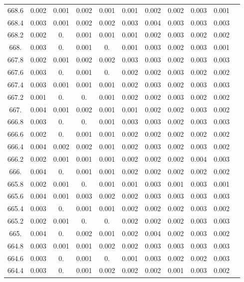 \documentclass[12pt]{ctexart}
\numberwithin{equation}{section}
\begin{document}
\begin{longtable}{ccccccccccc}
668.6	&	0.002	&	0.001	&	0.002	&	0.001	&	0.001	&	0.002	&	0.002	&	0.003	&	0.001	\\
668.4	&	0.003	&	0.001	&	0.002	&	0.002	&	0.003	&	0.004	&	0.003	&	0.003	&	0.003	\\
668.2	&	0.002	&	0.	&	0.001	&	0.001	&	0.001	&	0.002	&	0.003	&	0.002	&	0.002	\\
668.	&	0.003	&	0.	&	0.001	&	0.	&	0.001	&	0.003	&	0.002	&	0.003	&	0.001	\\
667.8	&	0.002	&	0.001	&	0.002	&	0.002	&	0.003	&	0.003	&	0.002	&	0.003	&	0.003	\\
667.6	&	0.003	&	0.	&	0.001	&	0.	&	0.002	&	0.002	&	0.003	&	0.002	&	0.002	\\
667.4	&	0.003	&	0.001	&	0.001	&	0.001	&	0.002	&	0.003	&	0.002	&	0.003	&	0.003	\\
667.2	&	0.001	&	0.	&	0.	&	0.001	&	0.002	&	0.002	&	0.003	&	0.002	&	0.002	\\
667.	&	0.004	&	0.001	&	0.002	&	0.001	&	0.001	&	0.002	&	0.002	&	0.003	&	0.002	\\
666.8	&	0.003	&	0.	&	0.	&	0.001	&	0.003	&	0.003	&	0.002	&	0.003	&	0.003	\\
666.6	&	0.002	&	0.	&	0.001	&	0.001	&	0.002	&	0.002	&	0.002	&	0.002	&	0.002	\\
666.4	&	0.004	&	0.002	&	0.002	&	0.001	&	0.002	&	0.003	&	0.002	&	0.003	&	0.002	\\
666.2	&	0.002	&	0.001	&	0.001	&	0.001	&	0.002	&	0.002	&	0.002	&	0.004	&	0.003	\\
666.	&	0.004	&	0.	&	0.001	&	0.001	&	0.002	&	0.002	&	0.002	&	0.002	&	0.002	\\
665.8	&	0.002	&	0.001	&	0.	&	0.001	&	0.001	&	0.003	&	0.001	&	0.003	&	0.001	\\
665.6	&	0.004	&	0.001	&	0.003	&	0.002	&	0.002	&	0.003	&	0.003	&	0.003	&	0.003	\\
665.4	&	0.003	&	0.	&	0.001	&	0.001	&	0.002	&	0.002	&	0.002	&	0.003	&	0.002	\\
665.2	&	0.002	&	0.001	&	0.	&	0.	&	0.002	&	0.002	&	0.002	&	0.003	&	0.003	\\
665.	&	0.004	&	0.	&	0.002	&	0.001	&	0.002	&	0.004	&	0.002	&	0.003	&	0.002	\\
664.8	&	0.003	&	0.001	&	0.001	&	0.002	&	0.002	&	0.003	&	0.003	&	0.003	&	0.003	\\
664.6	&	0.003	&	0.	&	0.001	&	0.	&	0.001	&	0.003	&	0.002	&	0.002	&	0.003	\\
664.4	&	0.003	&	0.	&	0.001	&	0.002	&	0.002	&	0.002	&	0.001	&	0.003	&	0.002	\\

\end{longtable}
\end{document}
